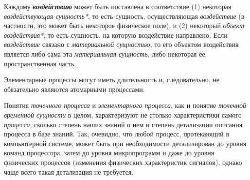 \begin{SCn}
\begin{SCn}
\begin{SCn}
\end{SCn}

Каждому \textbf{\textit{воздействию}} может быть поставлена в соответствие (1) некоторая \textit{воздействующая сущность*}, то есть сущность, осуществляющая \textit{воздействие} (в частности, это может быть некоторое физическое поле), и (2) некоторый \textit{объект воздействия*}, то есть сущность, на которую воздействие направлено. Если \textit{воздействие} связано с \textit{материальной сущностью}, то его объектом воздействия является либо сама эта \textit{материальная сущность}, либо некоторая ее пространственная часть.


\begin{SCn}
		
\end{SCn}

Элементарные процессы могут иметь длительность и, следовательно, не обязательно являются атомарными процессами.

Понятия \textit{точечного процесса} и \textit{элементарного процесса}, как и понятие \textit{точечной временной сущности} в целом, характеризуют не столько характеристики самого \textit{процесса}, сколько степень наших знаний о нем и степень детализации описания процесса в базе знаний. Так, очевидно, что любой процесс, протекающий в компьютерной системе, может быть при необходимости детализирован до уровня команд процессора, затем до уровня микропрограмм и даже до уровня физических процессов (изменения физических характеристик сигналов), однако чаще всего такая детализация не требуется.

\begin{SCn}


\end{SCn}
\end{SCn}
\end{SCn}
